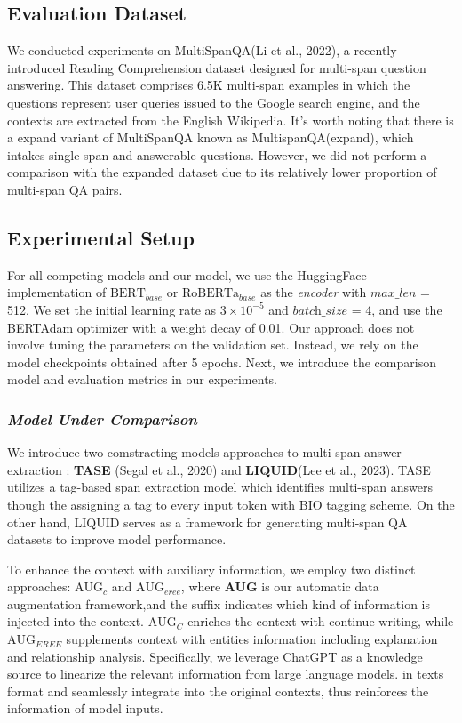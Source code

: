 \documentclass[mathematics,article,submit,moreauthors]{Definitions/mdpi}
\newcommand{\1}[1]{\mathds{1}\left[#1\right]}
\begin{document}
\subsection{Evaluation Dataset}
\label{sec:datasets}
	 We conducted experiments on MultiSpanQA(Li et al., 2022), a recently introduced Reading Comprehension dataset designed for multi-span question answering. This dataset comprises 6.5K multi-span examples in which the questions represent user queries issued to the Google search engine, and the contexts are extracted from the English Wikipedia. It's worth noting that there is a expand variant of MultiSpanQA known as MultispanQA(expand), which intakes single-span and answerable questions. However, we did not perform a comparison with the expanded dataset due to its relatively lower proportion of multi-span QA pairs.

\subsection{Experimental Setup}
	For all competing models and our model, we use the HuggingFace implementation of $\text{BERT}_{base}$ or $\text{RoBERTa}_{base}$ as the \textit{encoder} with $\textit{max\_len}$ = 512. We set the initial learning rate as $3 \times 10^{-5}$ and  $\textit{batch\_size}$ = 4, and use the BERTAdam optimizer with a weight decay of 0.01. Our approach does not involve tuning the parameters on the validation set. Instead, we rely on the model checkpoints obtained after 5 epochs. Next, we introduce the comparison model and evaluation metrics in our experiments.
	
	\subsubsection{\textit{Model Under Comparison}}
	\label{sec:baselines}
	We introduce two comstracting models approaches to multi-span answer extraction : \textbf{TASE} (Segal et al., 2020) and \textbf{LIQUID}(Lee et al., 2023). TASE utilizes a tag-based span extraction model which identifies multi-span answers though the assigning a tag to every input token with BIO tagging scheme. On the other hand, LIQUID serves as a framework for generating multi-span QA datasets to improve model performance.
	
	To enhance the context with auxiliary information, we employ two distinct   approaches: \textbf{$\text{AUG}_{c}$} and \textbf{$\text{AUG}_{eree}$}, where \textbf{AUG} is our automatic data augmentation framework,and the suffix indicates which kind of information is injected into the context. \textbf{$\text{AUG}_{C}$} enriches the context with continue writing, while \textbf{$\text{AUG}_{EREE}$} supplements context with entities information including explanation and relationship analysis.
	Specifically, we leverage ChatGPT as a knowledge source to linearize the relevant information from large language models. in texts format and seamlessly integrate into the original contexts, thus reinforces the information of model inputs.
\end{document}
